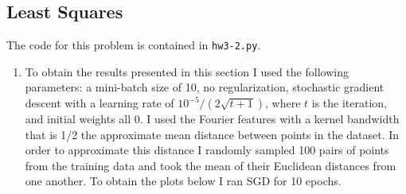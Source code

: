 \documentclass{article}
\begin{document}
\subsection{Least Squares}
The code for this problem is contained in \texttt{hw3-2.py}.
\begin{enumerate}
	\item To obtain the results presented in this section I used the following parameters: a mini-batch size of 10, no regularization, stochastic gradient descent with a learning rate of $10^{-5} / (2\sqrt{t+1})$, where $t$ is the iteration, and initial weights all 0. I used the Fourier features with a kernel bandwidth that is 1/2 the approximate mean distance between points in the dataset. In order to approximate this distance I randomly sampled 100 pairs of points from the training data and took the mean of their Euclidean distances from one another. To obtain the plots below I ran SGD for 10 epochs.
\end{enumerate}


\end{document}
